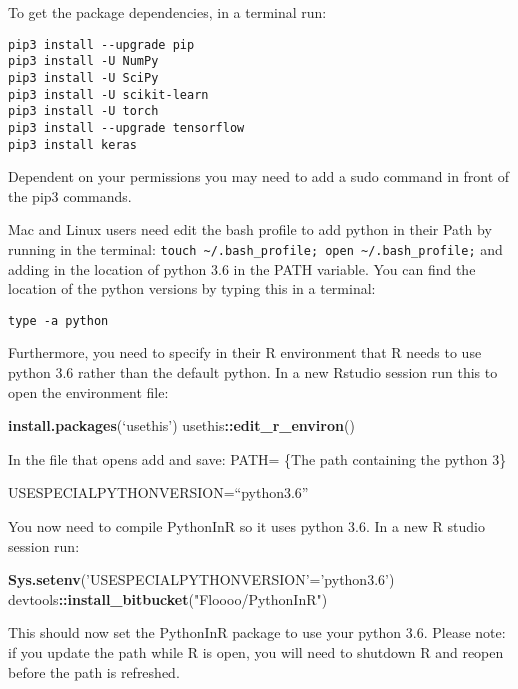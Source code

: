 \documentclass[]{article}
\newenvironment{Shaded}{\begin{snugshade}}{\end{snugshade}}
\newcommand{\KeywordTok}[1]{\textcolor[rgb]{0.13,0.29,0.53}{\textbf{#1}}}
\newcommand{\StringTok}[1]{\textcolor[rgb]{0.31,0.60,0.02}{#1}}
\newcommand{\OperatorTok}[1]{\textcolor[rgb]{0.81,0.36,0.00}{\textbf{#1}}}
\newcommand{\NormalTok}[1]{#1}
\begin{document}
To get the package dependencies, in a terminal run:

\begin{verbatim}
pip3 install --upgrade pip
pip3 install -U NumPy
pip3 install -U SciPy 
pip3 install -U scikit-learn
pip3 install -U torch
pip3 install --upgrade tensorflow 
pip3 install keras
\end{verbatim}

Dependent on your permissions you may need to add a sudo command in
front of the pip3 commands.

Mac and Linux users need edit the bash profile to add python in their
Path by running in the terminal:
\texttt{touch\ \textasciitilde{}/.bash\_profile;\ open\ \textasciitilde{}/.bash\_profile;}
and adding in the location of python 3.6 in the PATH variable. You can
find the location of the python versions by typing this in a terminal:

\begin{verbatim}
type -a python
\end{verbatim}

Furthermore, you need to specify in their R environment that R needs to
use python 3.6 rather than the default python. In a new Rstudio session
run this to open the environment file:

\begin{Shaded}
\begin{Highlighting}[]
\KeywordTok{install.packages}\NormalTok{(‘usethis’)}
\NormalTok{usethis}\OperatorTok{::}\KeywordTok{edit_r_environ}\NormalTok{()}
\end{Highlighting}
\end{Shaded}

In the file that opens add and save: PATH= \{The path containing the
python 3\}

USESPECIALPYTHONVERSION=``python3.6''

You now need to compile PythonInR so it uses python 3.6. In a new R
studio session run:

\begin{Shaded}
\begin{Highlighting}[]
\KeywordTok{Sys.setenv}\NormalTok{(}\StringTok{'USESPECIALPYTHONVERSION'}\NormalTok{=}\StringTok{'python3.6'}\NormalTok{)}
\NormalTok{devtools}\OperatorTok{::}\KeywordTok{install_bitbucket}\NormalTok{(}\StringTok{"Floooo/PythonInR"}\NormalTok{)}
\end{Highlighting}
\end{Shaded}

This should now set the PythonInR package to use your python 3.6. Please
note: if you update the path while R is open, you will need to shutdown
R and reopen before the path is refreshed.
\end{document}
